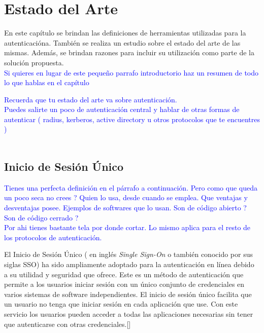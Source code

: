 


\chapter{Estado del Arte}\label{chapter:state-of-the-art}
En este capítulo se brindan las definiciones de herramientas utilizadas para la autenticacióna. También se realiza un estudio sobre el estado del arte de las mismas. Además, se brindan razones para incluir su utilización como parte de la solución propuesta.\\
\textcolor{blue}{Si quieres en lugar de este pequeño parrafo introductorio haz un resumen de todo lo que hablas en el capítulo }

\textcolor{blue}{Recuerda que tu estado del arte va sobre autenticación. \\
	Puedes salirte un poco de autenticación central y hablar de otras formas de autenticar ( radius, kerberos, active directory u otros protocolos que te encuentres )}\\\\


\section{Inicio de Sesión Único}
\textcolor{blue}{Tienes una perfecta definición en el párrafo a continuación. Pero como que queda un poco seca no crees ? Quien lo usa, desde cuando se emplea. Que ventajas y desventajas posee. Ejemplos de softwares que lo usan. Son de código abierto ? Son de código cerrado ? \\
Por ahi tienes bastante tela por donde cortar. Lo mismo aplica para el resto de los protocolos de autenticación.}

El Inicio de Sesión Único ( en inglés \textit{Single Sign-On} o también conocido por sus siglas SSO) ha sido ampliamente adoptado para la autenticación en línea debido a su utilidad y seguridad que ofrece. Este es un método de autenticación que permite a los usuarios iniciar sesión con un único conjunto de credenciales en varios sistemas de software independientes. El inicio de sesión único facilita que un usuario no tenga que iniciar sesión en cada aplicación que use. Con este servicio los usuarios pueden acceder a todas las aplicaciones necesarias sin tener que autenticarse con otras credenciales.[\cite{microsoft-doc}]

